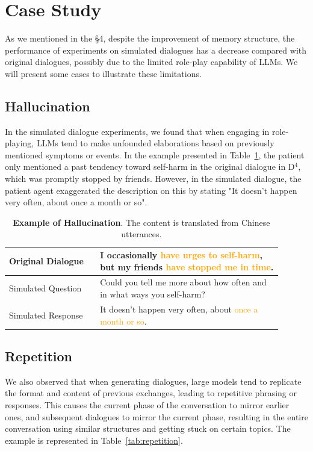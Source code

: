
\section{Case Study}
As we mentioned in the \S4, despite the improvement of memory structure, the performance of experiments on simulated dialogues has a decrease compared with original dialogues, possibly due to the limited role-play capability of LLMs. We will present some cases to illustrate these limitations. 

\subsection{Hallucination}
In the simulated dialogue experiments, we found that when engaging in role-playing, LLMs tend to make unfounded elaborations based on previously mentioned symptoms or events. In the example presented in Table~\ref{tab:hallucination}, the patient only mentioned a past tendency toward self-harm in the original dialogue in D$^4$, which was promptly stopped by friends. However, in the simulated dialogue, the patient agent exaggerated the description on this by stating "It doesn't happen very often, about once a month or so".

\begin{table}[!h]
    \centering
    \begin{tabular}{m{0.3\linewidth}m{0.6\linewidth}}
    \toprule
         Original Dialogue & I occasionally \textcolor{orange}{have urges to self-harm}, but my friends \textcolor{orange}{have stopped me in time}. \\ 
    \midrule
    \midrule
         Simulated Question & Could you tell me more about how often and in what ways you self-harm? \\
    \midrule
         Simulated Response & It doesn't happen very often, about \textcolor{orange}{once a month or so}. \\
    \bottomrule
    \end{tabular}
    \caption{\textbf{Example of Hallucination}. The content is translated from Chinese utterances.}
    \label{tab:hallucination}
\end{table}


\subsection{Repetition}
We also observed that when generating dialogues, large models tend to replicate the format and content of previous exchanges, leading to repetitive phrasing or responses. This causes the current phase of the conversation to mirror earlier ones, and subsequent dialogues to mirror the current phase, resulting in the entire conversation using similar structures and getting stuck on certain topics. The example is represented in Table~\ref{tab:repetition}.

